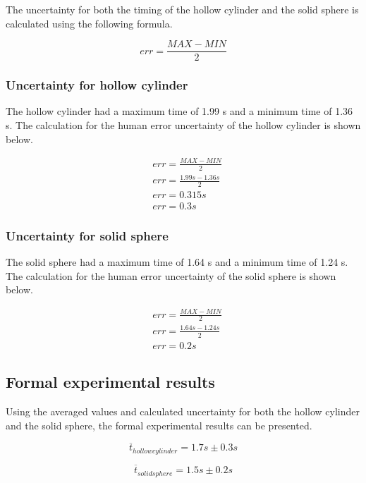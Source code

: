 \documentclass[letterpaper, 12pt]{article}
\begin{document}
The uncertainty for both the timing of the hollow cylinder and
the solid sphere is calculated using the following formula.

$$
    err = \frac{MAX - MIN}{2}
$$

\subsubsection{Uncertainty for hollow cylinder}

The hollow cylinder had a maximum time of 1.99 \unit{s} and a minimum
time of 1.36 \unit{s}. The calculation for the human error uncertainty of the hollow cylinder is
shown below.

\begin{align*}
     & err = \frac{MAX - MIN}{2}
    \\
     & err = \frac{1.99 \unit{s} - 1.36 \unit{s}}{2}
    \\
     & err = 0.315 \unit{s}
    \\
     & err = 0.3 \unit{s}
\end{align*}

\subsubsection{Uncertainty for solid sphere}

The solid sphere had a maximum time of 1.64 \unit{s} and a minimum time of 1.24 \unit{s}.
The calculation for the human error uncertainty of the solid sphere is shown below.

\begin{align*}
     & err = \frac{MAX - MIN}{2}
    \\
     & err = \frac{1.64\unit{s} - 1.24\unit{s}}{2}
    \\
     & err = 0.2\unit{s}
\end{align*}

\subsection{Formal experimental results}

Using the averaged values and calculated uncertainty for both the
hollow cylinder and the solid sphere, the formal experimental results
can be presented.

$$
    \overline{t}_{hollow cylinder} = 1.7 \unit{s} \pm 0.3 \unit{s}
$$

$$
    \overline{t}_{solid sphere} = 1.5 \unit{s} \pm 0.2 \unit{s}
$$
\end{document}

